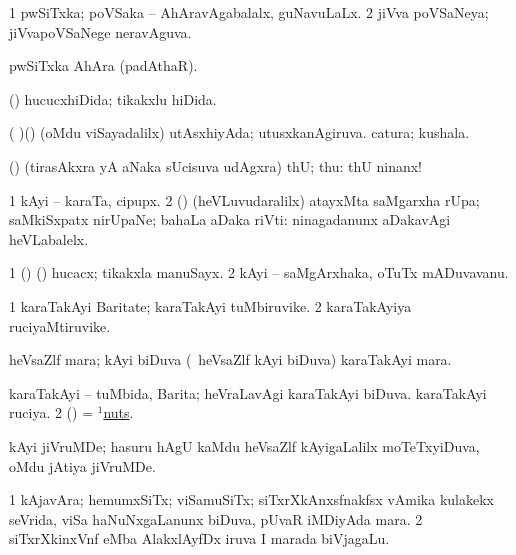 \bentry
{}
\gl{\gu}
\bmng
\bnum
\num{1} pwSiTxka; poVSaka -- AhAravAgabalalx, guNavuLaLx. 
\num{2} jiVva poVSaNeya; jiVvapoVSaNege neravAguva. 
\enum
\emng
\eentry

\bentry
{}
\gl{\nA}
\bmng
pwSiTxka AhAra (padAthaR). 
\emng
\eentry

\bentry
{}
\gl{\gu}
\bmng
(\ashi) hucucxhiDida; tikakxlu hiDida. 
\emng

\noindent
\gl{\pagu}
\bmng
{} ( )(\AmA) (oMdu viSayadalilx) 
\banum
{} utAsxhiyAda; utusxkanAgiruva. 
 catura; kushala. 
\eanum
\emng
\eentry

\bentry
{}
\gl{\BAavayx}
\bmng
(\ashi) (tirasAkxra yA aNaka sUcisuva udAgxra) thU; thu:  thU ninanx! 
\emng
\eentry

\bentry
{}
\gl{\nA}
\bmng
\bnum
\num{1} kAyi -- karaTa, cipupx. 
\num{2} (\rUpa) (heVLuvudaralilx) atayxMta saMgarxha rUpa; saMkiSxpatx nirUpaNe; bahaLa aDaka riVti:  ninagadanunx aDakavAgi heVLabalelx. 
\enum
\emng
\eentry

\bentry
{}
\gl{\nA}
\bmng
\bnum
\num{1} (\birx) (\ashi) hucacx; tikakxla manuSayx. 
\num{2} kAyi -- saMgArxhaka, oTuTx mADuvavanu. 
\enum
\emng
\eentry

\bentry
{}
\gl{\nA}
\bmng
\bnum
\num{1} karaTakAyi Baritate; karaTakAyi tuMbiruvike. 
\num{2} karaTakAyiya ruciyaMtiruvike. 
\enum
\emng
\eentry

\bentry
{}
\gl{\nA}
\bmng
heVsaZlf mara; kAyi biDuva (\kanmu\ heVsaZlf kAyi biDuva) karaTakAyi mara. 
\emng
\eentry

\bentry
{}
\gl{\gu}
\bmng
\bnum
{} 
\banum
{} karaTakAyi -- tuMbida, Barita; heVraLavAgi karaTakAyi biDuva. 
 karaTakAyi ruciya. 
\eanum
\numie
\num{2} (\ashi) = \hyperlink{nuts(1)}{$^1$nuts}. 
\enum
\emng
\eentry

\bentry
{}
\gl{\nA}
\bmng
kAyi jiVruMDe; hasuru hAgU kaMdu heVsaZlf kAyigaLalilx moTeTxyiDuva, oMdu jAtiya jiVruMDe. 
\emng
\eentry

\bentry
{}
\gl{\nA}
\bmng
\bnum
\num{1} kAjavAra; hemumxSiTx; viSamuSiTx; siTxrXkAnxsfnakfsx vAmika kulakekx seVrida, viSa haNuNxgaLanunx biDuva, pUvaR iMDiyAda mara. 
\num{2} siTxrXkinxVnf eMba AlakxlAyfDx iruva I marada biVjagaLu. 
\enum
\emng
\eentry

